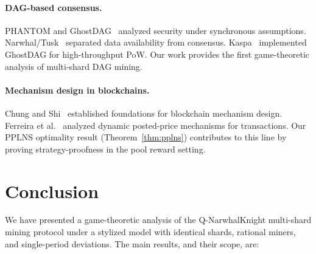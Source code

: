 \documentclass[11pt,a4paper]{article}
\theoremstyle{definition}
\theoremstyle{remark}
\newcommand{\QNK}{\textsf{Q-NarwhalKnight}}
\begin{document}
\paragraph{DAG-based consensus.}
PHANTOM and GhostDAG~\cite{sompolinsky2021phantom} analyzed security
under synchronous assumptions.
Narwhal/Tusk~\cite{danezis2022narwhal} separated data availability from
consensus.
Kaspa~\cite{kaspa2022} implemented GhostDAG for high-throughput PoW.
Our work provides the first game-theoretic analysis of multi-shard
DAG mining.

\paragraph{Mechanism design in blockchains.}
Chung and Shi~\cite{chung2023foundations} established foundations for
blockchain mechanism design.
Ferreira et al.~\cite{ferreira2021dynamic} analyzed dynamic posted-price
mechanisms for transactions.
Our PPLNS optimality result (Theorem~\ref{thm:pplns}) contributes to
this line by proving strategy-proofness in the pool reward setting.

\section{Conclusion}\label{sec:conclusion}

We have presented a game-theoretic analysis of the \QNK{} multi-shard
mining protocol under a stylized model with identical shards, rational
miners, and single-period deviations.
The main results, and their scope, are:
\end{document}
